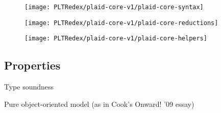 \begin{figure}
  \texttt{[image: PLTRedex/plaid-core-v1/plaid-core-syntax]}
\end{figure}

\begin{figure}
  \texttt{[image: PLTRedex/plaid-core-v1/plaid-core-reductions]}
\end{figure}

\begin{figure}
  \texttt{[image: PLTRedex/plaid-core-v1/plaid-core-helpers]}
\end{figure}

\subsection{Properties}

Type soundness

Pure object-oriented model (as in Cook's Onward! '09 essay)

